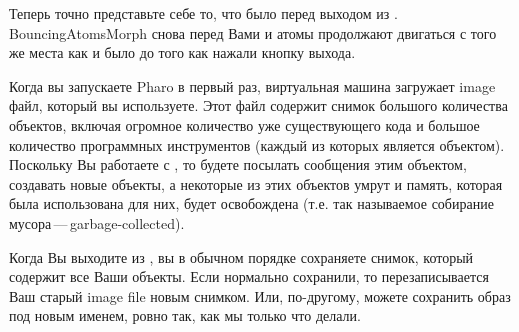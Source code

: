 \documentclass[a4paper,10pt,twoside]{book}
\begin{document}



Теперь точно представьте себе то, что было перед выходом из \pharo.
BouncingAtomsMorph снова перед Вами и атомы продолжают двигаться
с того же места как и было до того как  нажали кнопку выхода.


Когда вы запускаете Pharo в первый раз, виртуальная машина \pharo
загружает image файл, который вы используете. Этот файл содержит
снимок большого количества объектов, включая огромное количество уже
существующего кода и большое количество программных инструментов
(каждый из которых является объектом).  Поскольку Вы работаете с
\pharo, то будете посылать сообщения этим объектом, создавать новые
объекты, а некоторые из этих объектов умрут и память, которая была
использована для них, будет освобождена (т.е. так называемое
собирание мусора\,---\,garbage-collected). 


Когда Вы выходите из \pharo, вы в обычном порядке сохраняете снимок,
который содержит все Ваши объекты. Если нормально сохранили,
то перезаписывается Ваш старый image file новым снимком.
Или, по-другому,
можете сохранить образ под новым именем, ровно так,
как мы только что делали. 

\end{document}
